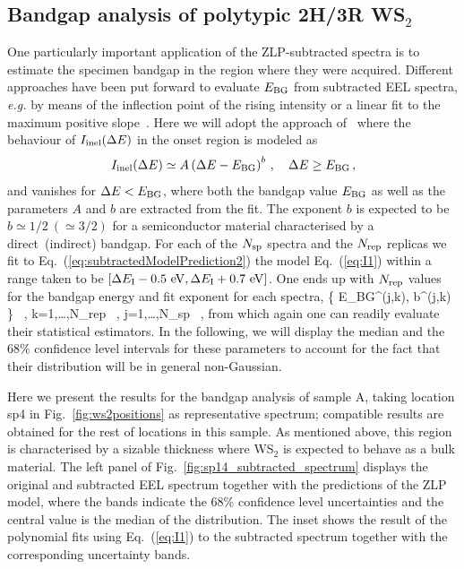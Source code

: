  \subsection{Bandgap analysis of polytypic 2H/3R WS$_2$}

 One particularly important application of the ZLP-subtracted spectra is to
 estimate the specimen bandgap in the region where
 they were acquired.
 Different approaches  have been put forward to evaluate $E_{\rm BG}$ from 
subtracted EEL spectra, \textit{e.g.} by means of the inflection point of the rising intensity or
a linear fit to the maximum positive slope~\cite{Schamm:2003}.
%
Here we will adopt the approach of~\cite{Rafferty:2000} where the behaviour
of $I_{\rm inel}(\Delta E)$ in the onset region is modeled as
\begin{equation}
  \label{eq:I1}
    I_{\rm inel}(\Delta E) \simeq  A \left( \Delta E-E_{\rm BG} \right)^{b} \, , \quad \Delta E \ge E_{\rm BG} \, ,
\end{equation}
and vanishes for $\Delta E < E_{\rm BG}$, where both the bandgap value
$E_{\rm BG}$ as well as the parameters $A$ and $b$ are extracted from the fit.
%
The exponent $b$ is expected to be $b\simeq 1/2~(\simeq 3/2)$ for a semiconductor material characterised
by a direct~(indirect) bandgap.
 For each of the $N_{\rm sp}$ spectra and the $N_{\rm rep}$ replicas
 we fit to Eq.~(\ref{eq:subtractedModelPrediction2}) the model Eq.~(\ref{eq:I1})
 within a range taken to be
 $\left[ \Delta E_{\rm I} - 0.5~{\rm eV}, \Delta E_{\rm I} + 0.7~{\rm eV}\right]$.
 One ends up with $N_{\rm rep}$ values for
 the bandgap energy and fit exponent for each spectra,
 \be
 \Big \{ E_{\rm BG}^{(j,k)}, b^{(j,k)} \Big\} \, , \quad k=1,\ldots,N_{\rm rep} \, ,
 \quad j=1,\ldots,N_{\rm sp} \, ,
 \ee
 from which again one can readily evaluate their statistical estimators.
 In the following, we will display the median and the 68\% confidence level intervals
 for these parameters to account for the fact that their distribution will be in general non-Gaussian.

Here we present the results for the bandgap analysis of sample A,
taking location sp4 in Fig.~\ref{fig:ws2positions} as representative spectrum; compatible
results are obtained for the rest of locations in this sample.
%
As mentioned above, this region is characterised by a sizable thickness where
WS$_2$ is expected to behave as a bulk material.
%
The left panel of Fig.~\ref{fig:sp14_subtracted_spectrum} displays the original
and subtracted EEL spectrum
together with the predictions of the ZLP model, where
the bands indicate the 68\% confidence level uncertainties and the central value
is the median of the distribution.
%
The inset shows the result of the polynomial fits using Eq.~(\ref{eq:I1}) to the subtracted spectrum
together with the corresponding uncertainty bands.

